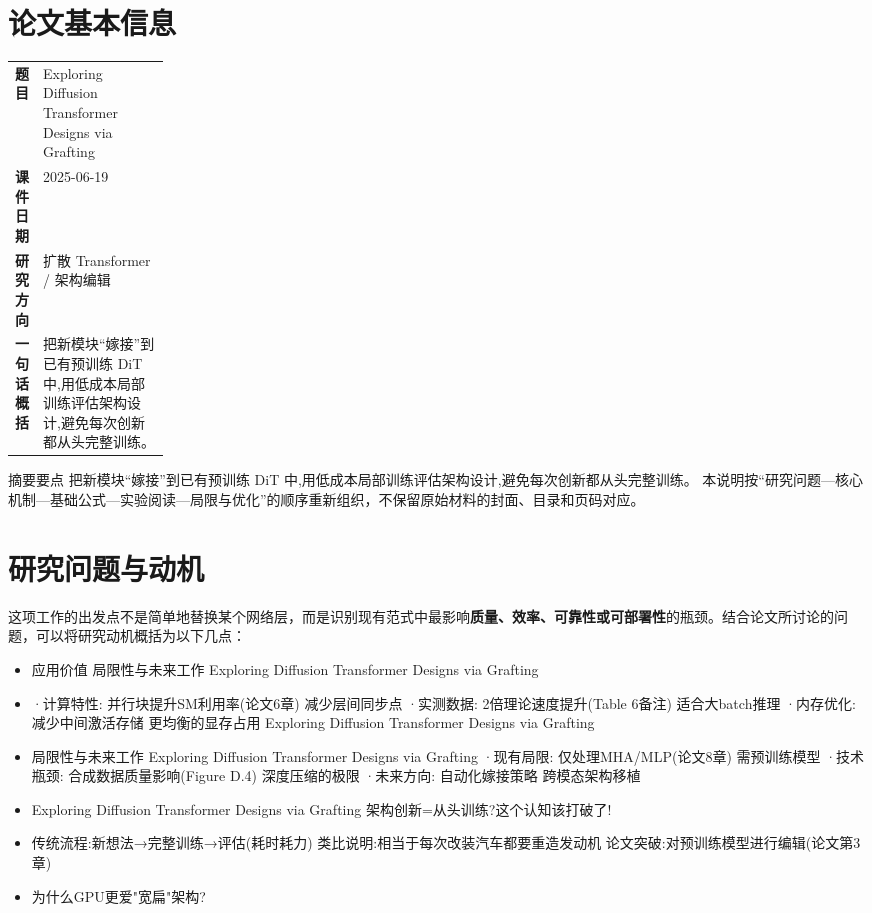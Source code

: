 \documentclass[UTF8,11pt,a4paper]{ctexart}
\newcommand{\term}[1]{\textbf{\textcolor{mainblue}{#1}}}
\begin{document}
\section{论文基本信息}
\begin{center}
\begin{tabularx}{0.94\linewidth}{>{\bfseries}p{0.18\linewidth}X}
\toprule
题目 & Exploring Diffusion Transformer Designs via Grafting\\
课件日期 & 2025-06-19\\
研究方向 & 扩散 Transformer / 架构编辑\\
一句话概括 & 把新模块“嫁接”到已有预训练 DiT 中,用低成本局部训练评估架构设计,避免每次创新都从头完整训练。\\
\bottomrule
\end{tabularx}
\end{center}

\begin{infobox}{摘要要点}
把新模块“嫁接”到已有预训练 DiT 中,用低成本局部训练评估架构设计,避免每次创新都从头完整训练。 本说明按“研究问题—核心机制—基础公式—实验阅读—局限与优化”的顺序重新组织，不保留原始材料的封面、目录和页码对应。
\end{infobox}

\section{研究问题与动机}
这项工作的出发点不是简单地替换某个网络层，而是识别现有范式中最影响\term{质量、效率、可靠性或可部署性}的瓶颈。结合论文所讨论的问题，可以将研究动机概括为以下几点：
\begin{itemize}
\item 应用价值 局限性与未来工作 Exploring Diffusion Transformer Designs via Grafting
\item ·计算特性: 并行块提升SM利用率(论文6章) 减少层间同步点 ·实测数据: 2倍理论速度提升(Table 6备注) 适合大batch推理 ·内存优化: 减少中间激活存储 更均衡的显存占用 Exploring Diffusion Transformer Designs via Grafting
\item 局限性与未来工作 Exploring Diffusion Transformer Designs via Grafting ·现有局限: 仅处理MHA/MLP(论文8章) 需预训练模型 ·技术瓶颈: 合成数据质量影响(Figure D.4) 深度压缩的极限 ·未来方向: 自动化嫁接策略 跨模态架构移植
\item Exploring Diffusion Transformer Designs via Grafting 架构创新=从头训练?这个认知该打破了!
\item 传统流程:新想法→完整训练→评估(耗时耗力) 类比说明:相当于每次改装汽车都要重造发动机 论文突破:对预训练模型进行编辑(论文第3章)
\item 为什么GPU更爱"宽扁"架构?
\end{itemize}
\end{document}
